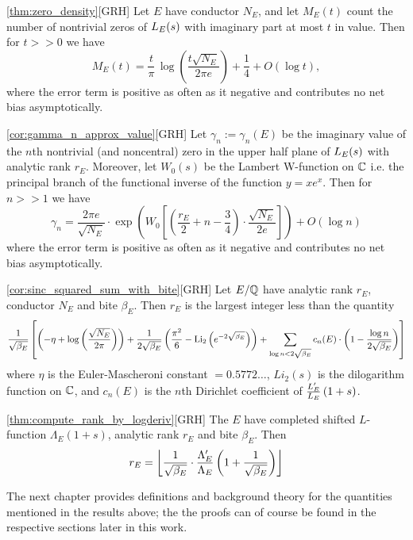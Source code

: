 \begin{quotedtheorem}{\ref{thm:zero_density}}[GRH]
Let $E$ have conductor $N_E$, and let $M_E(t)$ count the number of nontrivial zeros of $L_E(s)$ with imaginary part at most $t$ in value. Then for $t>>0$ we have
\begin{equation}\label{eqn:zero_density}
M_E(t) = \frac{t}{\pi} \, \log\left(\frac{t\sqrt{N_E}}{2\pi e}\right) + \frac{1}{4} + O(\log t),
\end{equation}
where the error term is positive as often as it negative and contributes no net bias asymptotically.
\end{quotedtheorem}

\begin{quotedcorollary}{\ref{cor:gamma_n_approx_value}}[GRH]
Let $\gamma_n := \gamma_n(E)$ be the imaginary value of the $n$th nontrivial (and noncentral) zero in the upper half plane of $L_E(s)$ with analytic rank $r_E$.  Moreover, let $W_0 (s)$ be the Lambert W-function on $\mathbb{C}$ i.e. the principal branch of the functional inverse of the function $y = x e^x$. Then for $n >> 1$ we have
\begin{equation}
\gamma_n = \frac{2\pi e}{\sqrt{N_E}} \cdot \exp \left(W_0\left[\left(\frac{r_E}{2} +n - \frac{3}{4}\right)\cdot \frac{\sqrt{N_E}}{2 e}\right]\right) + O(\log n)
\end{equation}
where the error term is positive as often as it negative and contributes no net bias asymptotically.
\end{quotedcorollary}

\begin{quotedcorollary}{\ref{cor:sinc_squared_sum_with_bite}}[GRH]
Let $E/\mathbb{Q}$ have analytic rank $r_E$, conductor $N_E$ and bite $\beta_E$. Then $r_E$ is the largest integer less than the quantity
\begin{equation}
\frac{1}{\sqrt{\beta_E}}\left[\left(-\eta + \log\left(\frac{\sqrt{N_E}}{2\pi}\right)\right)+ \frac{1}{2 \sqrt{\beta_E}}\left(\frac{\pi^2}{6} - \text{Li}_2\left(e^{-2\sqrt{\beta_E}}\right)\right) + \sum_{\log n<2\sqrt{\beta_E}} c_n(E) \cdot \left(1-\frac{\log n}{2\sqrt{\beta_E}}\right)\right]
\end{equation}
where $\eta$ is the Euler-Mascheroni constant $= 0.5772\ldots$, $Li_2(s)$ is the dilogarithm function on $\mathbb{C}$, and $c_n(E)$ is the $n$th Dirichlet coefficient of $\frac{L_E^{\prime}}{L_E}\left(1+s\right)$.
\end{quotedcorollary}

\begin{quotedtheorem}{\ref{thm:compute_rank_by_logderiv}}[GRH]
The $E$ have completed shifted $L$-function $\Lambda_E(1+s)$, analytic rank $r_E$ and bite $\beta_E$. Then
\begin{equation}
r_E = \left\lfloor\frac{1}{\sqrt{\beta_E}}\cdot \frac{\Lambda_E^{\prime}}{\Lambda_E}\left(1+\frac{1}{\sqrt{\beta_E}}\right)\right\rfloor
\end{equation}
\end{quotedtheorem}

The next chapter provides definitions and background theory for the quantities mentioned in the results above; the the proofs can of course be found in the respective sections later in this work.

